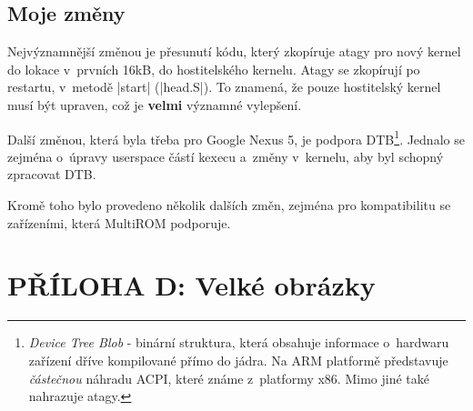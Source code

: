 \documentclass[12pt, a4paper, oneside]{article}
\newcommand{\B}{\textbf} %
\newcommand{\It}{\textit}  %
\begin{document}
\subsection*{Moje změny}
Nejvýznamnější změnou je přesunutí kódu, který zkopíruje atagy pro nový kernel do lokace v~prvních 16kB, do hostitelského kernelu. Atagy se zkopírují po restartu, v~metodě |start| (|head.S|). To znamená, že pouze hostitelský kernel musí být upraven, což je \B{velmi} významné vylepšení.

Další změnou, která byla třeba pro Google Nexus 5, je podpora DTB\footnote{\It{Device Tree Blob} - binární struktura, která obsahuje informace o~hardwaru zařízení dříve kompilované přímo do jádra. Na ARM platformě představuje \It{částečnou} náhradu ACPI, které známe z~platformy x86. Mimo jiné také nahrazuje atagy.}. Jednalo se zejména o~úpravy userspace částí kexecu a~změny v~kernelu, aby byl schopný zpracovat DTB.

Kromě toho bylo provedeno několik dalších změn, zejména pro kompatibilitu se zařízeními, která MultiROM podporuje.


\newpage
 \section*{PŘÍLOHA D: Velké obrázky}
\end{document}
